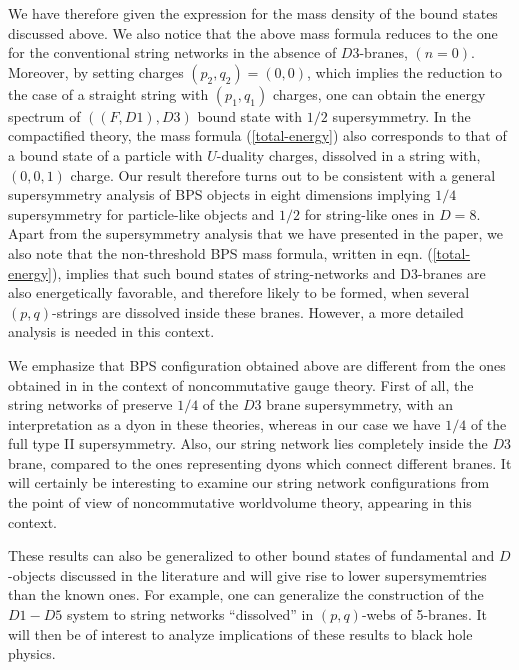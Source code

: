 \documentclass[a4paper,12pt]{article}
\begin{document}
We have therefore given the expression for the mass density of the 
bound states discussed above. We also notice that the above 
mass formula reduces to the one for 
the conventional string networks \cite{sen} 
in the absence of $D3$-branes, $(n=0)$. Moreover,
by setting charges $(p_2, q_2) = (0, 0)$, which implies the reduction to 
the case of a straight string with $(p_1, q_1)$ charges, one can obtain the 
energy spectrum of $((F, D1), D3)$ bound state with $1/2$ supersymmetry.  
In the compactified theory, the mass formula (\ref{total-energy})
also corresponds to that of a bound state of a particle with $U$-duality 
charges, dissolved in a string with, $(0, 0, 1)$ charge. 
Our result therefore turns out to be consistent with a 
general supersymmetry analysis of BPS objects in eight dimensions 
\cite{malda-ferra} implying $1/4$ supersymmetry for
particle-like objects and $1/2$ for string-like ones in $D = 8$.  
Apart from the supersymmetry analysis that we have presented in
the paper, we also
note that the non-threshold BPS mass formula, written in 
eqn. (\ref{total-energy}), implies that such bound states 
of string-networks and D3-branes are also 
energetically favorable, and therefore likely to be formed, 
when several $(p, q)$-strings are dissolved 
inside these branes. However, a more detailed analysis
is needed in this context.

We emphasize that BPS configuration obtained above are
different from the ones  obtained in \cite{hashi} in 
the context of noncommutative gauge 
theory. First of all, the string networks of \cite{hashi} 
preserve $1/4$ \cite{bergman}
of the $D3$ brane supersymmetry, with an interpretation 
as a dyon in these theories, whereas in our case we have 
$1/4$ of the full type II supersymmetry. Also, our string 
network lies completely inside the
$D3$ brane, compared to the ones representing dyons which connect
different branes. It will certainly be interesting to 
examine our string network configurations from the point of view of  
noncommutative worldvolume theory, appearing in this context.


These results can also be generalized to other bound states of 
fundamental and $D$-objects discussed in the literature \cite{lu,lu1} 
and will give rise to lower supersymemtries than the known ones. 
For example, one can generalize the construction of the $D1-D5$
system\cite{malda-russo} to string networks ``dissolved'' in 
$(p, q)$-webs of 5-branes. It will then be of interest to analyze 
implications of these results to black hole physics.
\end{document}
